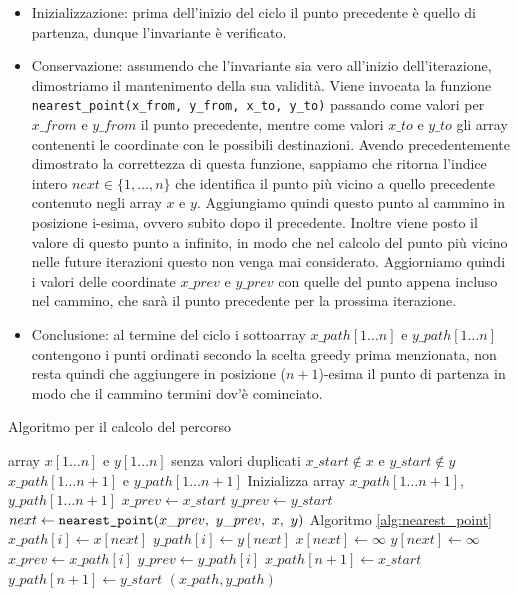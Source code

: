 \begin{itemize}
    \item Inizializzazione: prima dell'inizio del ciclo il punto precedente è quello di partenza, dunque l'invariante è verificato.
    \item Conservazione: assumendo che l'invariante sia vero all'inizio dell'iterazione, dimostriamo il mantenimento della sua validità. Viene invocata la funzione \verb|nearest_point(x_from, y_from, x_to, y_to)| passando come valori per $x\_from$ e $y\_from$ il punto precedente, mentre come valori $x\_to$ e $y\_to$ gli array contenenti le coordinate con le possibili destinazioni. Avendo precedentemente dimostrato la correttezza di questa funzione, sappiamo che ritorna l'indice intero $next \in \{ 1, \dotso, n \}$ che identifica il punto più vicino a quello precedente contenuto negli array $x$ e $y$. Aggiungiamo quindi questo punto al cammino in posizione i-esima, ovvero subito dopo il precedente. Inoltre viene posto il valore di questo punto a infinito, in modo che nel calcolo del punto più vicino nelle future iterazioni questo non venga mai considerato. Aggiorniamo quindi i valori delle coordinate $x\_prev$ e $y\_prev$ con quelle del punto appena incluso nel cammino, che sarà il punto precedente per la prossima iterazione.
    \item Conclusione: al termine del ciclo i sottoarray $x\_path[1\dotso n]$ e $y\_path[1 \dotso n]$ contengono i punti ordinati secondo la scelta greedy prima menzionata, non resta quindi che aggiungere in posizione ($n+1$)-esima il punto di partenza in modo che il cammino termini dov'è cominciato.
\end{itemize}

\begin{algorithm}
    \caption{Algoritmo per il calcolo del percorso}
    \label{alg:calculate_track}
    \begin{algorithmic}
        \Require array $x[1 \dotso n]$ e $y[1 \dotso n]$ senza valori duplicati
        \Require $x\_start \notin x$ e $y\_start \notin y$
        \Ensure $x\_path[1 \dotso n+1]$ e $y\_path[1 \dotso n+1]$
        \State Inizializza array $x\_path[1 \dotso n+1]$, $y\_path[1 \dotso n+1]$
        \State $x\_prev \leftarrow x\_start$
        \State $y\_prev \leftarrow y\_start$
            \State $next \leftarrow \verb|nearest_point|(x\_prev,\  y\_prev,\  x,\  y)$
            \Comment Algoritmo \ref{alg:nearest_point}
            \State $x\_path[i] \leftarrow x[next]$
            \State $y\_path[i] \leftarrow y[next]$
            \State $x[next] \leftarrow \infty$
            \State $y[next] \leftarrow \infty$
            \State $x\_prev \leftarrow x\_path[i]$
            \State $y\_prev \leftarrow y\_path[i]$
        \EndFor
        \State $x\_path[n+1] \leftarrow x\_start$
        \State $y\_path[n+1] \leftarrow y\_start$
        \State \Return $(x\_path , y\_path)$
    \end{algorithmic}
\end{algorithm}

